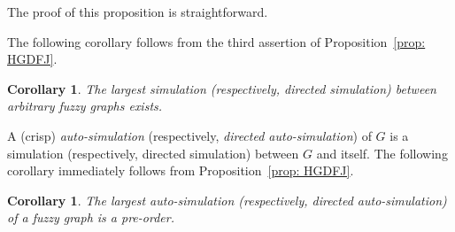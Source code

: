 \documentclass[11pt]{article}
\newtheorem{corollary}[theorem]{Corollary}
\begin{document}
The proof of this proposition is straightforward. 

The following corollary follows from the third assertion of Proposition~\ref{prop: HGDFJ}. 

\begin{corollary}
The largest simulation (respectively, directed simulation) between arbitrary fuzzy graphs exists.
\end{corollary}

A (crisp) {\em auto-simulation} (respectively, {\em directed auto-simulation}) of $G$ is a simulation (respectively, directed simulation) between $G$ and itself. The following corollary immediately follows from Proposition~\ref{prop: HGDFJ}. 

\begin{corollary}
The largest auto-simulation (respectively, directed auto-simulation) of a fuzzy graph is a pre-order.
\end{corollary}
\end{document}

